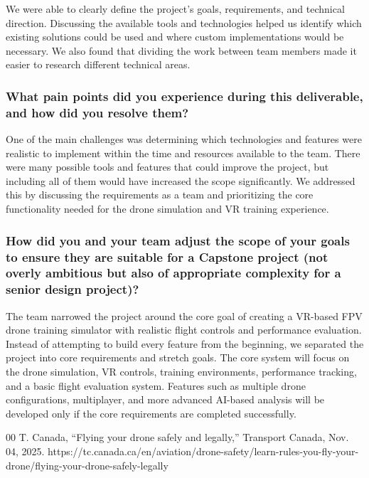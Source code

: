 \documentclass{article}
\begin{document}
We were able to clearly define the project's goals, requirements, and technical direction. Discussing the available tools and technologies helped us identify which existing solutions could be used and where custom implementations would be necessary. We also found that dividing the work between team members made it easier to research different technical areas.

\subsubsection*{What pain points did you experience during this deliverable, and how did you resolve them?}

One of the main challenges was determining which technologies and features were realistic to implement within the time and resources available to the team. There were many possible tools and features that could improve the project, but including all of them would have increased the scope significantly. We addressed this by discussing the requirements as a team and prioritizing the core functionality needed for the drone simulation and VR training experience. 

\subsubsection*{How did you and your team adjust the scope of your goals to ensure
    they are suitable for a Capstone project (not overly ambitious but also of
    appropriate complexity for a senior design project)?}

The team narrowed the project around the core goal of creating a VR-based FPV drone training simulator with realistic flight controls and performance evaluation. Instead of attempting to build every feature from the beginning, we separated the project into core requirements and stretch goals. The core system will focus on the drone simulation, VR controls, training environments, performance tracking, and a basic flight evaluation system. Features such as multiple drone configurations, multiplayer, and more advanced AI-based analysis will be developed only if the core requirements are completed successfully.

\begin{thebibliography}{00}
        T. Canada, “Flying your drone safely and legally,” Transport Canada, Nov. 04, 2025. 
        https://tc.canada.ca/en/aviation/drone-safety/learn-rules-you-fly-your-drone/flying-your-drone-safely-legally
\end{thebibliography}
\end{document}
